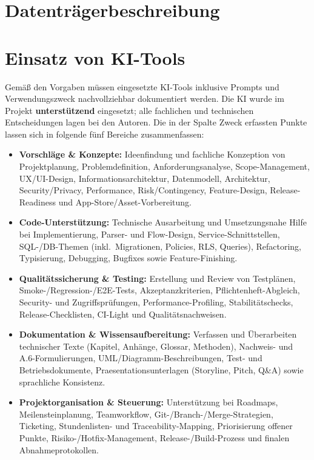 \Needspace{10cm}
\section{Datenträgerbeschreibung}

\Needspace{10cm}
\section{Einsatz von KI-Tools}

Gemäß den Vorgaben müssen eingesetzte KI-Tools inklusive Prompts und
Verwendungszweck nachvollziehbar dokumentiert werden. Die KI wurde im Projekt
\textbf{unterstützend} eingesetzt; alle fachlichen und technischen Entscheidungen
lagen bei den Autoren. Die in der Spalte \glqq Zweck\grqq{} erfassten Punkte lassen
sich in folgende fünf Bereiche zusammenfassen:

\begin{itemize}
  \item \textbf{Vorschläge \& Konzepte:} Ideenfindung und fachliche Konzeption von
  Projektplanung, Problemdefinition, Anforderungsanalyse, Scope-Management,
  UX/UI-Design, Informationsarchitektur, Datenmodell, Architektur, Security/Privacy,
  Performance, Risk/Contingency, Feature-Design, Release-Readiness und
  App-Store/Asset-Vorbereitung.
  \item \textbf{Code-Unterstützung:} Technische Ausarbeitung und Umsetzungsnahe
  Hilfe bei Implementierung, Parser- und Flow-Design, Service-Schnittstellen,
  SQL-/DB-Themen (inkl.\ Migrationen, Policies, RLS, Queries), Refactoring,
  Typisierung, Debugging, Bugfixes sowie Feature-Finishing.
  \item \textbf{Qualitätssicherung \& Testing:} Erstellung und Review von Testplänen,
  Smoke-/Regression-/E2E-Tests, Akzeptanzkriterien, Pflichtenheft-Abgleich,
  Security- und Zugriffsprüfungen, Performance-Profiling, Stabilitätschecks,
  Release-Checklisten, CI-Light und Qualitätsnachweisen.
  \item \textbf{Dokumentation \& Wissensaufbereitung:} Verfassen und Überarbeiten
  technischer Texte (Kapitel, Anhänge, Glossar, Methoden), Nachweis- und
  A.6-Formulierungen, UML/Diagramm-Beschreibungen, Test- und Betriebsdokumente,
  Praesentationsunterlagen (Storyline, Pitch, Q\&A) sowie sprachliche Konsistenz.
  \item \textbf{Projektorganisation \& Steuerung:} Unterstützung bei Roadmaps,
  Meilensteinplanung, Teamworkflow, Git-/Branch-/Merge-Strategien, Ticketing,
  Stundenlisten- und Traceability-Mapping, Priorisierung offener Punkte,
  Risiko-/Hotfix-Management, Release-/Build-Prozess und finalen Abnahmeprotokollen.
\end{itemize}

